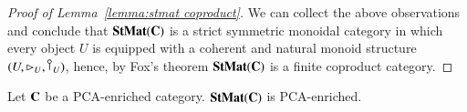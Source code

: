 \begin{proof}[Proof of Lemma~\ref{lemma:stmat coproduct}]
We can collect the above observations and conclude that $\mathbf{StMat}(\mathbf{C})$ is a strict symmetric monoidal category in which every object $U$ is equipped with a coherent and natural monoid structure $(U,\codiag{U},\cobang{U})$, hence, by Fox's theorem $\mathbf{StMat}(\mathbf{C})$ is a finite coproduct category.
\end{proof}



\iffalse
{}
\begin{lemma}\label{lemma:stmat pca enriched}
    Let $\mathbf{C}$ be a PCA-enriched category. $\mathbf{StMat}(\mathbf{C})$ is PCA-enriched.
\end{lemma}
%
%
